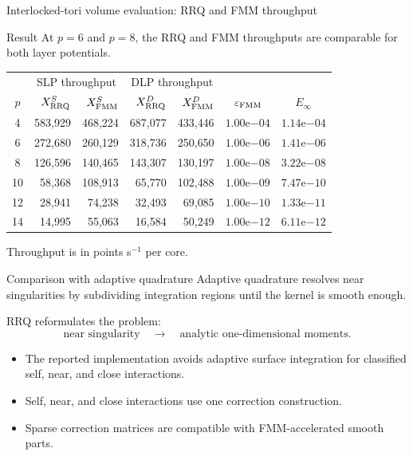 \documentclass[aspectratio=169,11pt]{beamer}
\begin{document}
\begin{frame}{Interlocked-tori volume evaluation: RRQ and FMM throughput}
\small
\begin{block}{Result}
At $p=6$ and $p=8$, the RRQ and FMM throughputs are comparable for both layer
potentials.
\end{block}
\vspace{2mm}
\centering
\renewcommand{\arraystretch}{1.22}
\begin{tabular}{c|rr|rr|cc}
  & \multicolumn{2}{c|}{SLP throughput} & \multicolumn{2}{c|}{DLP throughput} & & \\
  $p$ & $X_{\rm RRQ}^{S}$ & $X_{\rm FMM}^{S}$ & $X_{\rm RRQ}^{D}$ & $X_{\rm FMM}^{D}$ & $\varepsilon_{\rm FMM}$ & $E_\infty$ \\
  \hline
  4  & 583{,}929 & 468{,}224 & 687{,}077 & 433{,}446 & $1.00\mathrm{e}{-04}$ & $1.14\mathrm{e}{-04}$ \\
  6  & 272{,}680 & 260{,}129 & 318{,}736 & 250{,}650 & $1.00\mathrm{e}{-06}$ & $1.41\mathrm{e}{-06}$ \\
  8  & 126{,}596 & 140{,}465 & 143{,}307 & 130{,}197 & $1.00\mathrm{e}{-08}$ & $3.22\mathrm{e}{-08}$ \\
  10 & 58{,}368  & 108{,}913 & 65{,}770  & 102{,}488 & $1.00\mathrm{e}{-09}$ & $7.47\mathrm{e}{-10}$ \\
  12 & 28{,}941  & 74{,}238  & 32{,}493  & 69{,}085  & $1.00\mathrm{e}{-10}$ & $1.33\mathrm{e}{-11}$ \\
  14 & 14{,}995  & 55{,}063  & 16{,}584  & 50{,}249  & $1.00\mathrm{e}{-12}$ & $6.11\mathrm{e}{-12}$ \\
\end{tabular}
\par\vspace{1mm}
\footnotesize Throughput is in points s$^{-1}$ per core.
\end{frame}

\begin{frame}{Comparison with adaptive quadrature}
\small
Adaptive quadrature resolves near singularities by subdividing integration
regions until the kernel is smooth enough.

RRQ reformulates the problem:
\[
  \text{near singularity}
  \quad\longrightarrow\quad
  \text{analytic one-dimensional moments}.
\]

\begin{itemize}
  \item The reported implementation avoids adaptive surface integration for
  classified self, near, and close interactions.
  \item Self, near, and close interactions use one correction construction.
  \item Sparse correction matrices are compatible with FMM-accelerated smooth parts.
\end{itemize}
\end{frame}
\end{document}
